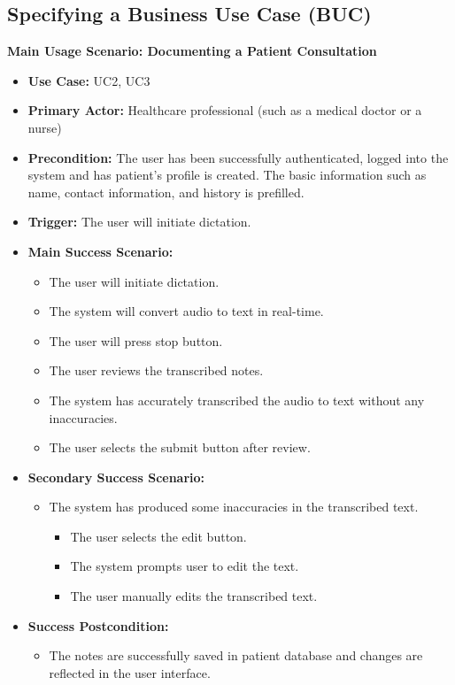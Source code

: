 \documentclass[12pt]{article}
\begin{document}
\subsection{Specifying a Business Use Case (BUC)}

\textbf{Main Usage Scenario: Documenting a Patient Consultation}

\begin{itemize}
  \item\textbf{Use Case:} UC2, UC3
  \item\textbf{Primary Actor:} Healthcare professional (such as a medical doctor or a nurse)
  \item\textbf{Precondition:} The user has been successfully authenticated, logged into the system and has patient's profile is created. The basic information such as name, contact information, and history is prefilled.
  \item\textbf{Trigger:} The user will initiate dictation.
  \item\textbf{Main Success Scenario:}
  \begin{itemize}
    \item The user will initiate dictation.
    \item The system will convert audio to text in real-time.
    \item The user will press stop button.
    \item The user reviews the transcribed notes. 
    \item The system has accurately transcribed the audio to text without any inaccuracies.
    \item The user selects the submit button after review. 
  \end{itemize}
  \item\textbf{Secondary Success Scenario:}
  \begin{itemize}
    \item The system has produced some inaccuracies in the transcribed text.
    \begin{itemize}
      \item The user selects the edit button.
      \item The system prompts user to edit the text.
      \item The user manually edits the transcribed text.
    \end{itemize} 
  \end{itemize}
  \item\textbf{Success Postcondition:}
  \begin{itemize}
    \item The notes are successfully saved in patient database and changes are reflected in the user interface.
  \end{itemize}
\end{itemize}
\end{document}
